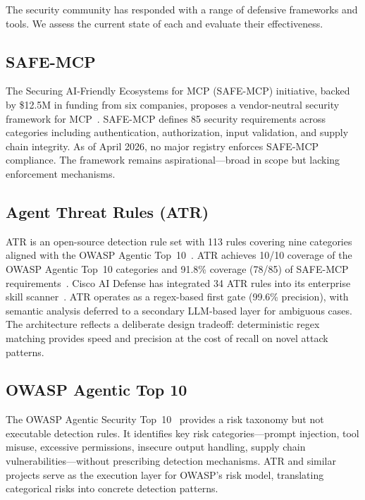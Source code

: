 \documentclass[11pt,twocolumn]{article}
\begin{document}
The security community has responded with a range of defensive frameworks and tools. We assess the current state of each and evaluate their effectiveness.

\subsection{SAFE-MCP}

The Securing AI-Friendly Ecosystems for MCP (SAFE-MCP) initiative, backed by \$12.5M in funding from six companies, proposes a vendor-neutral security framework for MCP~\cite{safe-mcp}. SAFE-MCP defines 85 security requirements across categories including authentication, authorization, input validation, and supply chain integrity. As of April 2026, no major registry enforces SAFE-MCP compliance. The framework remains aspirational---broad in scope but lacking enforcement mechanisms.

\subsection{Agent Threat Rules (ATR)}

ATR is an open-source detection rule set with 113 rules covering nine categories aligned with the OWASP Agentic Top~10~\cite{atr-project, owasp-agentic}. ATR achieves 10/10 coverage of the OWASP Agentic Top~10 categories and 91.8\% coverage (78/85) of SAFE-MCP requirements~\cite{atr-safemcp}. Cisco AI Defense has integrated 34 ATR rules into its enterprise skill scanner~\cite{cisco-atr}. ATR operates as a regex-based first gate (99.6\% precision), with semantic analysis deferred to a secondary LLM-based layer for ambiguous cases. The architecture reflects a deliberate design tradeoff: deterministic regex matching provides speed and precision at the cost of recall on novel attack patterns.

\subsection{OWASP Agentic Top 10}

The OWASP Agentic Security Top~10~\cite{owasp-agentic} provides a risk taxonomy but not executable detection rules. It identifies key risk categories---prompt injection, tool misuse, excessive permissions, insecure output handling, supply chain vulnerabilities---without prescribing detection mechanisms. ATR and similar projects serve as the execution layer for OWASP's risk model, translating categorical risks into concrete detection patterns.
\end{document}
